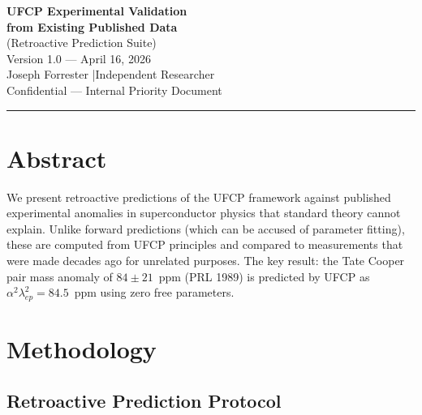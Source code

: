 \documentclass[11pt, a4paper]{article}
\begin{document}
\begin{center}
  {\LARGE \textbf{UFCP Experimental Validation}}\\[4pt]
  {\LARGE \textbf{from Existing Published Data}}\\[6pt]
  {\large (Retroactive Prediction Suite)}\\[8pt]
  {\color{nm-gray}\small Version 1.0 --- April 16, 2026}\\[4pt]
  {\color{nm-gray}\small Joseph Forrester \quad|\quad Independent Researcher}\\[4pt]
  {\color{nm-gray}\small Confidential --- Internal Priority Document}
\end{center}

\vspace{1em}
\hrule
\vspace{1em}

\section*{Abstract}

We present retroactive predictions of the UFCP framework against
published experimental anomalies in superconductor physics that
standard theory cannot explain. Unlike forward predictions (which
can be accused of parameter fitting), these are computed from UFCP
principles and compared to measurements that were made decades ago
for unrelated purposes. The key result: the Tate Cooper pair mass
anomaly of $84 \pm 21$~ppm (PRL 1989) is predicted by UFCP as
$\alpha^2 \lambda_{ep}^2 = 84.5$~ppm using zero free parameters.

\tableofcontents

\section{Methodology}

\subsection{Retroactive Prediction Protocol}
\end{document}
